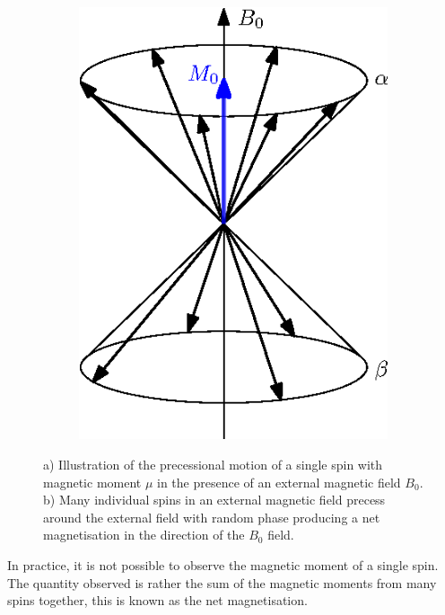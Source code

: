 \begin{figure}
\begin{subfigure}{0.3\textwidth}
		\includegraphics[width = \textwidth]{figures/background/manyspins.eps}
		\caption{}
		\label{fig:manyspins}
	\end{subfigure}
	
	\caption{a) Illustration of the precessional motion of a single spin with magnetic moment $\mu$ in the presence of an external magnetic field $B_0$. b) Many individual spins in an external magnetic field precess around the external field with random phase producing a net magnetisation in the direction of the $B_0$ field.}
	\label{fig:precession-spins}
	
\end{figure}


In practice, it is not possible to observe the magnetic moment of a single spin. 
The quantity observed is rather the sum of the magnetic moments from many spins together, this is known as the net magnetisation. 

